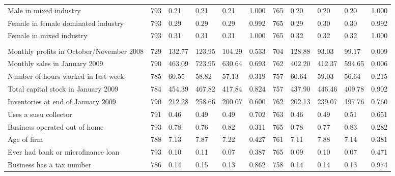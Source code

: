 \documentclass{report}
\begin{document}
\begin{table}[H]
{\begin{tabular}{lllllllllll}
\hspace{1em}Male in mixed industry & 793 & 0.21 & 0.21 & 0.21 & 1.000 & 765 & 0.20 & 0.20 & 0.20 & 1.000\\
\hspace{1em}Female in female dominated industry & 793 & 0.29 & 0.29 & 0.29 & 0.992 & 765 & 0.29 & 0.30 & 0.30 & 0.992\\
\hspace{1em}Female in mixed industry & 793 & 0.31 & 0.31 & 0.31 & 1.000 & 765 & 0.32 & 0.32 & 0.32 & 1.000\\
\addlinespace[0.3em]
\multicolumn{11}{l}{\textbf{Other variables}}\\
\hspace{1em}Monthly profits in October/November 2008 & 729 & 132.77 & 123.95 & 104.29 & 0.533 & 704 & 128.88 & 93.03 & 99.17 & 0.009\\
\hspace{1em}Monthly sales in January 2009 & 790 & 463.09 & 723.95 & 630.64 & 0.693 & 762 & 402.20 & 412.37 & 594.65 & 0.006\\
\hspace{1em}Number of hours worked in last week & 785 & 60.55 & 58.82 & 57.13 & 0.319 & 757 & 60.64 & 59.03 & 56.64 & 0.215\\
\hspace{1em}Total capital stock in January 2009 & 784 & 454.39 & 467.82 & 417.84 & 0.824 & 757 & 437.90 & 446.46 & 409.78 & 0.902\\
\hspace{1em}Inventories at end of January 2009 & 790 & 212.28 & 258.66 & 200.07 & 0.600 & 762 & 202.13 & 239.07 & 197.76 & 0.760\\
\hspace{1em}Uses a susu collector & 791 & 0.46 & 0.49 & 0.49 & 0.702 & 763 & 0.46 & 0.49 & 0.51 & 0.651\\
\hspace{1em}Business operated out of home & 793 & 0.78 & 0.76 & 0.82 & 0.311 & 765 & 0.78 & 0.77 & 0.83 & 0.282\\
\hspace{1em}Age of firm & 788 & 7.13 & 7.87 & 7.22 & 0.427 & 761 & 7.11 & 7.88 & 7.14 & 0.381\\
\hspace{1em}Ever had bank or microfinance loan & 793 & 0.10 & 0.11 & 0.07 & 0.387 & 765 & 0.09 & 0.10 & 0.07 & 0.471\\
\hspace{1em}Business has a tax number & 786 & 0.14 & 0.15 & 0.13 & 0.862 & 758 & 0.14 & 0.14 & 0.13 & 0.974\\

\end{tabular}}
\end{table}
\end{document}
